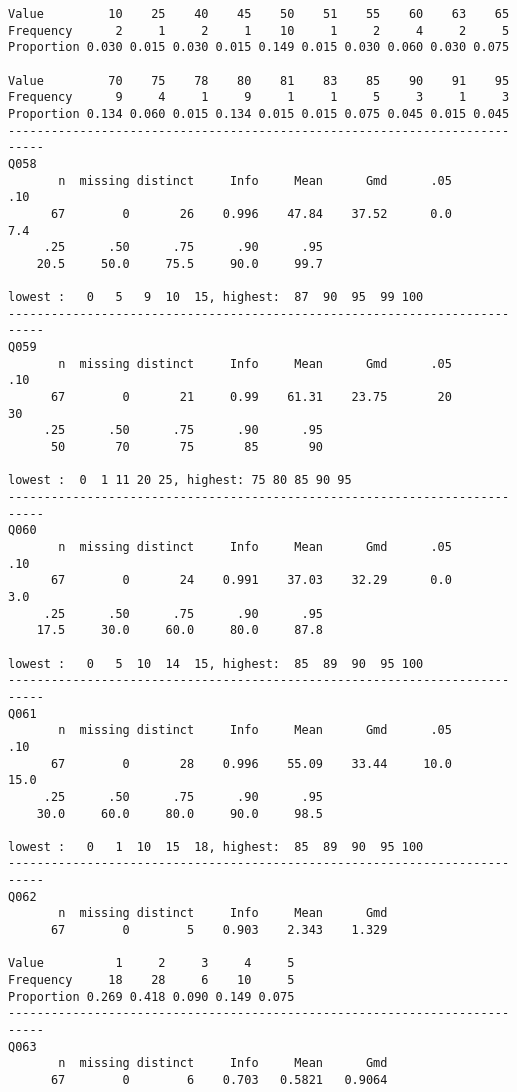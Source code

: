 \documentclass[]{article}
\begin{document}
\begin{verbatim}
Value         10    25    40    45    50    51    55    60    63    65
Frequency      2     1     2     1    10     1     2     4     2     5
Proportion 0.030 0.015 0.030 0.015 0.149 0.015 0.030 0.060 0.030 0.075
                                                                      
Value         70    75    78    80    81    83    85    90    91    95
Frequency      9     4     1     9     1     1     5     3     1     3
Proportion 0.134 0.060 0.015 0.134 0.015 0.015 0.075 0.045 0.015 0.045
---------------------------------------------------------------------------
Q058 
       n  missing distinct     Info     Mean      Gmd      .05      .10 
      67        0       26    0.996    47.84    37.52      0.0      7.4 
     .25      .50      .75      .90      .95 
    20.5     50.0     75.5     90.0     99.7 

lowest :   0   5   9  10  15, highest:  87  90  95  99 100
---------------------------------------------------------------------------
Q059 
       n  missing distinct     Info     Mean      Gmd      .05      .10 
      67        0       21     0.99    61.31    23.75       20       30 
     .25      .50      .75      .90      .95 
      50       70       75       85       90 

lowest :  0  1 11 20 25, highest: 75 80 85 90 95
---------------------------------------------------------------------------
Q060 
       n  missing distinct     Info     Mean      Gmd      .05      .10 
      67        0       24    0.991    37.03    32.29      0.0      3.0 
     .25      .50      .75      .90      .95 
    17.5     30.0     60.0     80.0     87.8 

lowest :   0   5  10  14  15, highest:  85  89  90  95 100
---------------------------------------------------------------------------
Q061 
       n  missing distinct     Info     Mean      Gmd      .05      .10 
      67        0       28    0.996    55.09    33.44     10.0     15.0 
     .25      .50      .75      .90      .95 
    30.0     60.0     80.0     90.0     98.5 

lowest :   0   1  10  15  18, highest:  85  89  90  95 100
---------------------------------------------------------------------------
Q062 
       n  missing distinct     Info     Mean      Gmd 
      67        0        5    0.903    2.343    1.329 
                                        
Value          1     2     3     4     5
Frequency     18    28     6    10     5
Proportion 0.269 0.418 0.090 0.149 0.075
---------------------------------------------------------------------------
Q063 
       n  missing distinct     Info     Mean      Gmd 
      67        0        6    0.703   0.5821   0.9064 
                                              

\end{verbatim}
\end{document}
